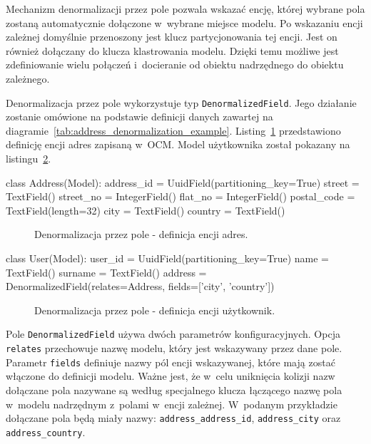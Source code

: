 Mechanizm denormalizacji przez pole pozwala wskazać encję, której wybrane pola zostaną automatycznie dołączone w~wybrane miejsce modelu. Po wskazaniu encji zależnej domyślnie przenoszony jest klucz partycjonowania tej encji. Jest on również dołączany do klucza klastrowania modelu. Dzięki temu możliwe jest zdefiniowanie wielu połączeń i~docieranie od obiektu nadrzędnego do obiektu zależnego. 

Denormalizacja przez pole wykorzystuje typ \verb+DenormalizedField+. Jego działanie zostanie omówione na podstawie definicji danych zawartej na diagramie~\ref{tab:address_denormalization_example}. Listing~\ref{lst:denormalization_by_field_address_entity} przedstawiono definicję encji adres zapisaną w~OCM. Model użytkownika został pokazany na listingu~\ref{lst:denormalization_by_field_example}. 

\begin{verbbox}
class Address(Model):
    address_id = UuidField(partitioning_key=True)
    street = TextField()
    street_no = IntegerField()
    flat_no = IntegerField()
    postal_code = TextField(length=32)
    city = TextField()
    country = TextField()
\end{verbbox}

\begin{figure}[ht!]
	\centering
	\theverbbox
	\caption{Denormalizacja przez pole - definicja encji adres.}
	\label{lst:denormalization_by_field_address_entity}
\end{figure}

\begin{verbbox}
class User(Model):
    user_id = UuidField(partitioning_key=True)
    name = TextField()
    surname = TextField()
    address = DenormalizedField(relates=Address, 
                                fields=['city', 'country'])
\end{verbbox}

\begin{figure}[ht!]
	\centering
	\theverbbox
	\caption{Denormalizacja przez pole - definicja encji użytkownik.}
	\label{lst:denormalization_by_field_example}
\end{figure}

Pole \verb+DenormalizedField+ używa dwóch parametrów konfiguracyjnych. Opcja \verb+relates+ przechowuje nazwę modelu, który jest wskazywany przez dane pole. Parametr \verb+fields+ definiuje nazwy pól encji wskazywanej, które mają zostać włączone do definicji modelu. Ważne jest, że w~celu uniknięcia kolizji nazw dołączane pola nazywane są według specjalnego klucza łączącego nazwę pola w~modelu nadrzędnym z~polami w~encji zależnej. W~podanym przykładzie dołączane pola będą miały nazwy: \verb+address_address_id+, \verb+address_city+ oraz \verb+address_country+.

